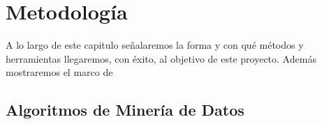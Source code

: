 \chapter{Metodología}
A lo largo de este capitulo señalaremos la forma y con qué métodos y herramientas llegaremos, con éxito, al objetivo de este proyecto. Además mostraremos el marco de 
\section{Algoritmos de Minería de Datos}
